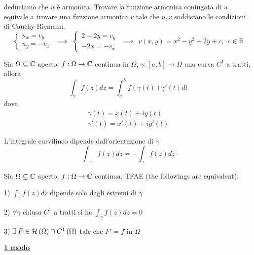 deduciamo che $u$ è armonica. Trovare la funzione armonica coniugata di $u$ equivale a trovare una funzione armonica $v$ tale che $u,v$ soddisfano le condizioni di Cauchy-Riemann.
\begin{equation*}
\begin{cases}
u_{x} =v_{y}\\
u_{y} =-v_{x}
\end{cases} \ \ \implies \ \ \begin{cases}
2-2y=v_{y}\\
-2x=-v_{x}
\end{cases} \ \ \implies \ \ v\left( x,y\right) =x^{2} -y^{2} +2y+c,\ \ c\in \mathbb{R}
\end{equation*}
\Soluzione
\begin{defn}
Sia $\Omega \subseteq \mathbb{C} $ aperto, $f:\Omega \rightarrow \mathbb{C} $ continua in $\Omega $, $\gamma :\left[ a,b\right]\rightarrow \Omega $ una curva $C^{1}$ a tratti, allora
\begin{equation*}
\int\nolimits _{\gamma } f\left( z\right) dz=\int\nolimits ^{b}_{a} f\left( \gamma \left( t\right)\right) \gamma '\left( t\right) dt
\end{equation*}
dove
\begin{gather*}
\gamma \left( t\right) =x\left( t\right) +iy\left( t\right)\\
\gamma '\left( t\right) =x'\left( t\right) +iy'\left( t\right)
\end{gather*}
\end{defn}
\begin{rem}
L'integrale curvilineo dipende dall'orientazione di $\gamma $
\begin{equation*}
\int\nolimits _{-\gamma } f\left( z\right) dz=-\int\nolimits _{\gamma } f\left( z\right) dz
\end{equation*}
\end{rem}
\begin{thm}
Sia $\Omega \subseteq \mathbb{C} $ aperto, $f:\Omega \rightarrow \mathbb{C} $ continua. TFAE (the followings are equivalent):

1) $\int _{\gamma } f\left( z\right) dz$ dipende solo dagli estremi di $\gamma $

2) $\forall \gamma $ chiusa $C^{1}$ a tratti si ha $\int _{\gamma } f\left( z\right) dz=0$

3) $\exists F\in \Hc \left( \Omega \right) \cap C^{1}\left( \Omega \right)$ tale che $F'=f$ in $\Omega $
\end{thm}
\textbf{\underline{1 modo}}
